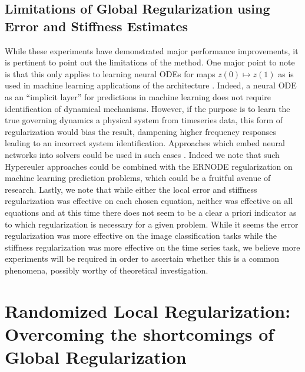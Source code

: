 \subsection{Limitations of Global Regularization using Error and Stiffness Estimates}
\label{subsec:limitations_of_using_error_and_stiffness_estimates}

While these experiments have demonstrated major performance improvements, it is pertinent to point out the limitations of the method. One major point to note is that this only applies to learning neural ODEs for maps $z(0) \mapsto z(1)$ as is used in machine learning applications of the architecture \cite{chen2018neural}. Indeed, a neural ODE as an ``implicit layer'' for predictions in machine learning does not require identification of dynamical mechanisms. However, if the purpose is to learn the true governing dynamics a physical system from timeseries data, this form of regularization would bias the result, dampening higher frequency responses leading to an incorrect system identification. Approaches which embed neural networks into solvers could be used in such cases \cite{shen2020deep,poli2020hypersolvers}. Indeed we note that such Hypereuler approaches could be combined with the ERNODE regularization on machine learning prediction problems, which could be a fruitful avenue of research. Lastly, we note that while either the local error and stiffness regularization was effective on each chosen equation, neither was effective on all equations and at this time there does not seem to be a clear a priori indicator as to which regularization is necessary for a given problem. While it seems the error regularization was more effective on the image classification tasks while the stiffness regularization was more effective on the time series task, we believe more experiments will be required in order to ascertain whether this is a common phenomena, possibly worthy of theoretical investigation.

\section{Randomized Local Regularization: Overcoming the shortcomings of Global Regularization}
\label{sec:randomized_local_regularization_overcoming_the_shortcomings_of_global_regularization}


